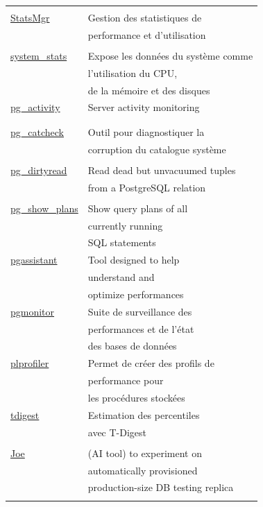 \documentclass[a4paper,12pt]{article}
\begin{document}
\begin{multicols*}{2}
\begin{table}[H]
\begin{tabular}{ll}
 & \\
\href{https://codeberg.org/Data-Bene/StatsMgr}{StatsMgr} & Gestion des statistiques de\\
 & performance et d'utilisation\\
 & \\
\href{https://github.com/EnterpriseDB/system\_stats}{system\_stats} & Expose les données du système comme\\
 & l'utilisation du CPU,\\
 & de la mémoire et des disques\\
\href{https://github.com/dalibo/pg\_activity}{pg\_activity} & Server activity monitoring\\
 & \\
 & \\
\href{https://github.com/EnterpriseDB/pg\_catcheck}{pg\_catcheck} & Outil pour diagnostiquer la\\
 & corruption du catalogue système\\
 & \\
\href{https://github.com/df7cb/pg\_dirtyread}{pg\_dirtyread} & Read dead but unvacuumed tuples\\
 & from a PostgreSQL relation\\
 & \\
\href{https://github.com/cybertec-postgresql/pg\_show\_plans}{pg\_show\_plans} & Show query plans of all\\
 & currently running\\
 & SQL statements\\
\href{https://github.com/nexsol-technologies/pgassistant}{pgassistant} & Tool designed to help\\
 & understand and\\
 & optimize performances\\
\href{https://github.com/CrunchyData/pgmonitor-extension}{pgmonitor} & Suite de surveillance des\\
 & performances et de l'état\\
 & des bases de données\\
\href{https://github.com/bigsql/plprofiler}{plprofiler} & Permet de créer des profils de\\
 & performance pour\\
 & les procédures stockées\\
\href{https://github.com/tvondra/tdigest}{tdigest} & Estimation des  percentiles\\
 & avec T-Digest\\
 & \\
\href{https://gitlab.com/postgres-ai/joe}{Joe} & (AI tool) to experiment on\\
 & automatically provisioned\\
 & production-size DB testing replica\\
 & \\
\end{tabular}
\end{table}


\end{multicols*}
\end{document}
